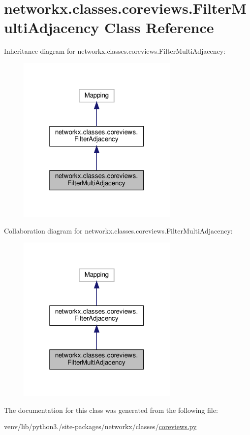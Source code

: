 \hypertarget{classnetworkx_1_1classes_1_1coreviews_1_1FilterMultiAdjacency}{}\section{networkx.\+classes.\+coreviews.\+Filter\+Multi\+Adjacency Class Reference}
\label{classnetworkx_1_1classes_1_1coreviews_1_1FilterMultiAdjacency}


Inheritance diagram for networkx.\+classes.\+coreviews.\+Filter\+Multi\+Adjacency\+:
\nopagebreak
\begin{figure}[H]
\begin{center}
\leavevmode
\includegraphics[width=223pt]{classnetworkx_1_1classes_1_1coreviews_1_1FilterMultiAdjacency__inherit__graph}
\end{center}
\end{figure}


Collaboration diagram for networkx.\+classes.\+coreviews.\+Filter\+Multi\+Adjacency\+:
\nopagebreak
\begin{figure}[H]
\begin{center}
\leavevmode
\includegraphics[width=223pt]{classnetworkx_1_1classes_1_1coreviews_1_1FilterMultiAdjacency__coll__graph}
\end{center}
\end{figure}


The documentation for this class was generated from the following file\+:\begin{DoxyCompactItemize}
\item 
venv/lib/python3./site-\/packages/networkx/classes/\hyperlink{coreviews_8py}{coreviews.\+py}\end{DoxyCompactItemize}
